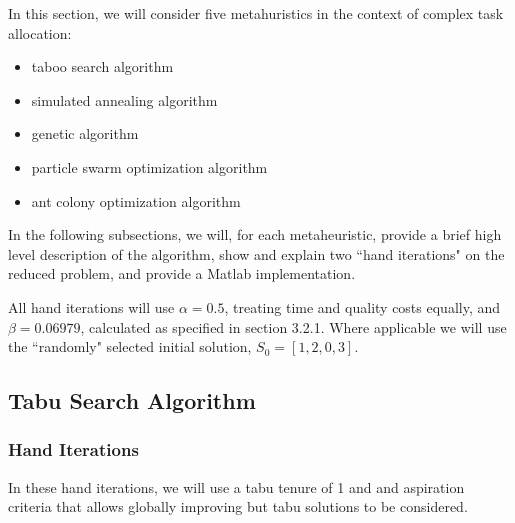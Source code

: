 \documentclass[a4paper]{article}
\begin{document}



In this section, we will consider five metahuristics in the context of complex task allocation:
\begin{itemize}
\item taboo search algorithm
\item simulated annealing algorithm
\item genetic algorithm
\item particle swarm optimization algorithm
\item ant colony optimization algorithm
\end{itemize}

In the following subsections, we will, for each metaheuristic, provide a brief
high level description of the algorithm, show and explain two ``hand iterations"
on the reduced problem, and provide a Matlab implementation.

All hand iterations will use $\alpha = 0.5$, treating time and quality costs
equally, and $\beta = 0.06979$, calculated as specified in section 3.2.1. Where applicable
we will use the ``randomly" selected initial solution, $S_0 = [ 1, 2, 0, 3 ]$.

\subsection{Tabu Search Algorithm} %


\subsubsection{Hand Iterations}

In these hand iterations, we will use a tabu tenure of 1 and and aspiration criteria that allows globally improving but tabu solutions to be considered.
\end{document}
